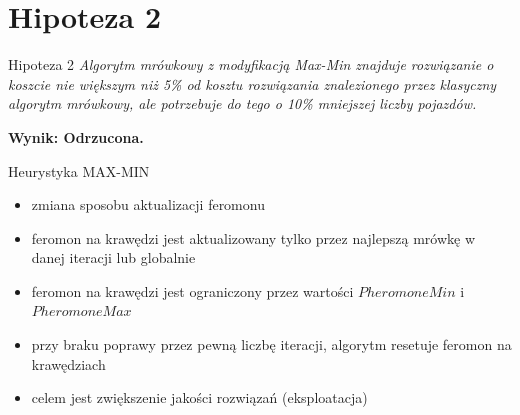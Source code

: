 \documentclass{beamer}
\begin{document}
\section*{Hipoteza 2}

\begin{frame}{Hipoteza 2}
    \textit{Algorytm mrówkowy z modyfikacją Max-Min znajduje rozwiązanie o koszcie nie większym niż 5\% od kosztu rozwiązania znalezionego przez klasyczny algorytm mrówkowy, ale potrzebuje do tego o 10\% mniejszej liczby pojazdów.}
    \vspace{1em}
    
    \textbf{Wynik: Odrzucona.} 
\end{frame}


\begin{frame}{Heurystyka MAX-MIN}
    \begin{itemize}
        \setlength\itemsep{1em}
        \item zmiana sposobu aktualizacji feromonu
        \item feromon na krawędzi jest aktualizowany tylko przez najlepszą mrówkę w danej iteracji lub globalnie
        \item feromon na krawędzi jest ograniczony przez wartości $PheromoneMin$ i $PheromoneMax$
        \item przy braku poprawy przez pewną liczbę iteracji, algorytm resetuje feromon na krawędziach
        \item celem jest zwiększenie jakości rozwiązań (eksploatacja)
    \end{itemize}
\end{frame}
\end{document}
